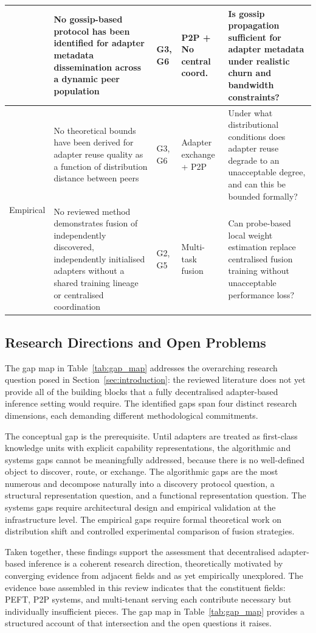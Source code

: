 \begin{table}[H]
\begin{tabular}{p{2cm}p{3.5cm}p{1.5cm}p{2cm}p{4cm}}
  &
  No gossip-based protocol has been identified for adapter metadata dissemination across
  a dynamic peer population &
  G3, G6 &
  P2P + No central coord. &
  Is gossip propagation sufficient for adapter metadata under realistic churn
  and bandwidth constraints? \\
\midrule
\multirow{2}{*}{Empirical} &
  No theoretical bounds have been derived for adapter reuse quality as a function of
  distribution distance between peers &
  G3, G6 &
  Adapter exchange + P2P &
  Under what distributional conditions does adapter reuse degrade to an
  unacceptable degree, and can this be bounded formally? \\[4pt]
  &
  No reviewed method demonstrates fusion of independently discovered,
  independently initialised adapters without a shared training lineage or
  centralised coordination &
  G2, G5 &
  Multi-task fusion &
  Can probe-based local weight estimation replace centralised fusion training
  without unacceptable performance loss? \\
\bottomrule
\end{tabular}
\end{table}

\subsection{Research Directions and Open Problems}
\label{sec:synthesis_gap:directions}

The gap map in Table~\ref{tab:gap_map} addresses the overarching research question posed in Section~\ref{sec:introduction}: the reviewed literature does not yet provide all of the building blocks that a fully decentralised adapter-based inference setting would require. The identified gaps span four distinct research dimensions, each demanding different methodological commitments.

The conceptual gap is the prerequisite. Until adapters are treated as
first-class knowledge units with explicit capability representations, the
algorithmic and systems gaps cannot be meaningfully addressed, because there
is no well-defined object to discover, route, or exchange. The algorithmic
gaps are the most numerous and decompose naturally into a discovery protocol
question, a structural representation question, and a functional representation
question. The systems gaps require architectural design and empirical validation
at the infrastructure level. The empirical gaps require formal theoretical work
on distribution shift and controlled experimental comparison of fusion strategies.

Taken together, these findings support the assessment that decentralised adapter-based
inference is a coherent research direction, theoretically motivated by converging evidence
from adjacent fields and as yet empirically unexplored. The evidence base assembled in this review indicates that
the constituent fields: PEFT, P2P systems, and multi-tenant serving
each contribute necessary but individually insufficient pieces. The gap map in 
Table~\ref{tab:gap_map} provides a structured account of that intersection 
and the open questions it raises.